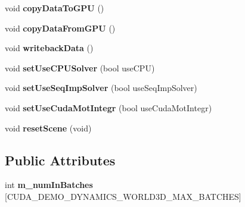 \begin{DoxyCompactItemize}
\item 
\hypertarget{classbt_cuda_demo_dynamics_world3_d_a583ad04cc4ecbc8f46380a489a12c683}{void {\bfseries copy\+Data\+To\+G\+P\+U} ()}\label{classbt_cuda_demo_dynamics_world3_d_a583ad04cc4ecbc8f46380a489a12c683}

\item 
\hypertarget{classbt_cuda_demo_dynamics_world3_d_a2e085b457de1a938a294a8d80d95588d}{void {\bfseries copy\+Data\+From\+G\+P\+U} ()}\label{classbt_cuda_demo_dynamics_world3_d_a2e085b457de1a938a294a8d80d95588d}

\item 
\hypertarget{classbt_cuda_demo_dynamics_world3_d_a74a19445de2a670b5765981075e5ba5d}{void {\bfseries writeback\+Data} ()}\label{classbt_cuda_demo_dynamics_world3_d_a74a19445de2a670b5765981075e5ba5d}

\item 
\hypertarget{classbt_cuda_demo_dynamics_world3_d_a51c5dfc3ecd5b1212c41df2a31004658}{void {\bfseries set\+Use\+C\+P\+U\+Solver} (bool use\+C\+P\+U)}\label{classbt_cuda_demo_dynamics_world3_d_a51c5dfc3ecd5b1212c41df2a31004658}

\item 
\hypertarget{classbt_cuda_demo_dynamics_world3_d_a7bc3d3c408fa8a83224d757580d83014}{void {\bfseries set\+Use\+Seq\+Imp\+Solver} (bool use\+Seq\+Imp\+Solver)}\label{classbt_cuda_demo_dynamics_world3_d_a7bc3d3c408fa8a83224d757580d83014}

\item 
\hypertarget{classbt_cuda_demo_dynamics_world3_d_abfb133443bb58062823a4cd14bfce7d2}{void {\bfseries set\+Use\+Cuda\+Mot\+Integr} (bool use\+Cuda\+Mot\+Integr)}\label{classbt_cuda_demo_dynamics_world3_d_abfb133443bb58062823a4cd14bfce7d2}

\item 
\hypertarget{classbt_cuda_demo_dynamics_world3_d_a311498a3c6c4e9c5441fce042e5d7134}{void {\bfseries reset\+Scene} (void)}\label{classbt_cuda_demo_dynamics_world3_d_a311498a3c6c4e9c5441fce042e5d7134}

\end{DoxyCompactItemize}
\subsection*{Public Attributes}
\begin{DoxyCompactItemize}
\item 
\hypertarget{classbt_cuda_demo_dynamics_world3_d_a2639a03a4ae0f2ba6fa614e11d8ae7b8}{int {\bfseries m\+\_\+num\+In\+Batches} \mbox{[}C\+U\+D\+A\+\_\+\+D\+E\+M\+O\+\_\+\+D\+Y\+N\+A\+M\+I\+C\+S\+\_\+\+W\+O\+R\+L\+D3\+D\+\_\+\+M\+A\+X\+\_\+\+B\+A\+T\+C\+H\+E\+S\mbox{]}}\label{classbt_cuda_demo_dynamics_world3_d_a2639a03a4ae0f2ba6fa614e11d8ae7b8}

\end{DoxyCompactItemize}
